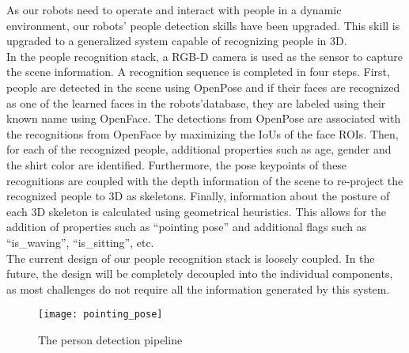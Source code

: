 As our robots need to operate and interact with people in a dynamic environment, our robots’ people detection skills have been upgraded. This skill is upgraded to a generalized system capable of recognizing people in 3D. 
\\
In the people recognition stack, a RGB-D camera is used as the sensor to capture the scene information. A recognition sequence is completed in four steps. First, people are detected in the scene using OpenPose and if their faces are recognized as one of the learned faces in the robots'database, they are labeled using their known name using OpenFace. The detections from OpenPose are associated with the recognitions from OpenFace by maximizing the IoUs of the face ROIs. Then, for each of the recognized people, additional properties such as age, gender and the shirt color are identified. Furthermore, the pose keypoints of these recognitions are coupled with the depth information of the scene to re-project the recognized people to 3D as skeletons. Finally, information about the posture of each 3D skeleton is calculated using geometrical heuristics. This allows for the addition of properties such as “pointing pose” and additional flags such as “is\_waving”, “is\_sitting”, etc.
\\
The current design of our people recognition stack is loosely coupled. In the future, the design will be completely decoupled into the individual components, as most challenges do not require all the information generated by this system.

\begin{figure}[H]
	\centering
    \texttt{[image: pointing\_pose]}
	\caption{The person detection pipeline}
	\label{fig:people_recognition}
\end{figure}